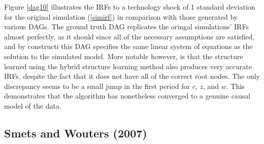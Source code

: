 \documentclass{article}
\begin{document}
Figure \ref{dag10} illustrates the IRFs to a technology shock of 1 standard deviation for the original simulation (\ref{simirf}) in comparison with those generated by various DAGs. The ground truth DAG replicates the oringal simulations' IRFs almost perfectly, as it should since all of the necessary assumptions are satisfied, and by constructi this DAG specifies the same linear system of equations as the solution to the simulated model. More notable however, is that the structure learned using the hybrid structure learning method also produces very accurate IRFs, despite the fact that it does not have all of the correct root nodes. The only discrepancy seems to be a small jump in the first period for $c$, $z$, and $w$. This demonstrates that the algorithm has nonetheless converged to a genuine causal model of the data.

\subsection{Smets and Wouters (2007)}
\end{document}

